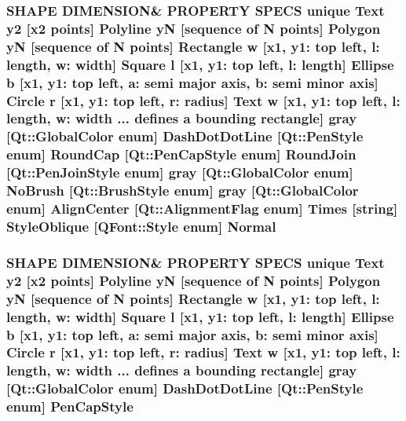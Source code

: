 \subsubsection[{\texorpdfstring{Normal}{Normal}}]{\setlength{\rightskip}{0pt plus 5cm}S\+H\+A\+PE D\+I\+M\+E\+N\+S\+I\+ON\& P\+R\+O\+P\+E\+R\+TY S\+P\+E\+CS unique {\bf Text} {\bf y2} \mbox{[}{\bf x2} points\mbox{]} {\bf Polyline} yN \mbox{[}sequence of N points\mbox{]} {\bf Polygon} yN \mbox{[}sequence of N points\mbox{]} {\bf Rectangle} w \mbox{[}{\bf x1}, y1\+: top left, l\+: length, w\+: width\mbox{]} {\bf Square} {\bf l} \mbox{[}{\bf x1}, y1\+: top left, l\+: length\mbox{]} {\bf Ellipse} b \mbox{[}{\bf x1}, y1\+: top left, a\+: semi major axis, b\+: semi minor axis\mbox{]} {\bf Circle} r \mbox{[}{\bf x1}, y1\+: top left, r\+: radius\mbox{]} {\bf Text} w \mbox{[}{\bf x1}, y1\+: top left, l\+: length, w\+: width ... defines {\bf a} bounding rectangle\mbox{]} gray \mbox{[}Qt\+::\+Global\+Color enum\mbox{]} Dash\+Dot\+Dot\+Line \mbox{[}Qt\+::\+Pen\+Style enum\mbox{]} Round\+Cap \mbox{[}{\bf Qt\+::\+Pen\+Cap\+Style} enum\mbox{]} Round\+Join \mbox{[}{\bf Qt\+::\+Pen\+Join\+Style} enum\mbox{]} gray \mbox{[}Qt\+::\+Global\+Color enum\mbox{]} No\+Brush \mbox{[}{\bf Qt\+::\+Brush\+Style} enum\mbox{]} gray \mbox{[}Qt\+::\+Global\+Color enum\mbox{]} Align\+Center \mbox{[}Qt\+::\+Alignment\+Flag enum\mbox{]} Times \mbox{[}string\mbox{]} Style\+Oblique \mbox{[}Q\+Font\+::\+Style enum\mbox{]} Normal}\hypertarget{shape__input__file__specs_8txt_a0c0bd83f93fb282ea2b33e44c2f3cc34}{}\label{shape__input__file__specs_8txt_a0c0bd83f93fb282ea2b33e44c2f3cc34}
\subsubsection[{\texorpdfstring{Pen\+Cap\+Style}{PenCapStyle}}]{\setlength{\rightskip}{0pt plus 5cm}S\+H\+A\+PE D\+I\+M\+E\+N\+S\+I\+ON\& P\+R\+O\+P\+E\+R\+TY S\+P\+E\+CS unique {\bf Text} {\bf y2} \mbox{[}{\bf x2} points\mbox{]} {\bf Polyline} yN \mbox{[}sequence of N points\mbox{]} {\bf Polygon} yN \mbox{[}sequence of N points\mbox{]} {\bf Rectangle} w \mbox{[}{\bf x1}, y1\+: top left, l\+: length, w\+: width\mbox{]} {\bf Square} {\bf l} \mbox{[}{\bf x1}, y1\+: top left, l\+: length\mbox{]} {\bf Ellipse} b \mbox{[}{\bf x1}, y1\+: top left, a\+: semi major axis, b\+: semi minor axis\mbox{]} {\bf Circle} r \mbox{[}{\bf x1}, y1\+: top left, r\+: radius\mbox{]} {\bf Text} w \mbox{[}{\bf x1}, y1\+: top left, l\+: length, w\+: width ... defines {\bf a} bounding rectangle\mbox{]} gray \mbox{[}Qt\+::\+Global\+Color enum\mbox{]} Dash\+Dot\+Dot\+Line \mbox{[}Qt\+::\+Pen\+Style enum\mbox{]} Pen\+Cap\+Style}\hypertarget{shape__input__file__specs_8txt_a622efdcfef6789d4367974d2fe79019e}{}\label{shape__input__file__specs_8txt_a622efdcfef6789d4367974d2fe79019e}
